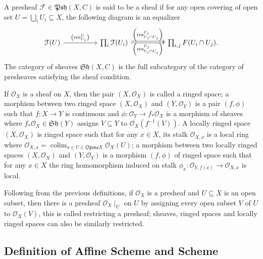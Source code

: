 \documentclass[a4paper,UKenglish,cleveref, autoref, thm-restate]{lipics-v2021}
\begin{document}
\begin{definition}
    A presheaf $\mathcal{F}\in\mathfrak{Psh}(X, C)$ is said to be a sheaf if for any open covering of open set $U=\bigcup_i U_i \subseteq X$, the following diagram is an equalizer
    $$
        \begin{tikzcd}[sep=huge]
        \mathcal{F}(U) \arrow[r, "\left(\mathrm{res}^U_{U_i}\right)"] & \prod_i \mathcal{F}(U_i) \arrow[r, "\left(\mathrm{res}^{U_i}_{U_i\cap U_j}\right)"] \arrow[r, shift left, "\left(\mathrm{res}^{U_j}_{U_i\cap U_j}\right)"'] & \prod_{i, j} F(U_i \cap U_j).
        \end{tikzcd}
    $$
    The category of sheaves $\mathfrak{Sh}(X,C)$ is the full subcategory of the category of presheaves satisfying the sheaf condition.
\end{definition}

\begin{definition} 
    If $\mathcal{O}_X$ is a sheaf on $X$, then the pair $(X, \mathcal{O}_X)$ is called a ringed space; a morphism between two ringed space $(X, \mathcal{O}_X)$ and $(Y, \mathcal{O}_Y)$ is a pair $(f, \phi)$ such that $f: X \to Y$ is continuous and $\phi : \mathcal{O}_Y\to f_*\mathcal{O}_X$ is a morphism of sheaves where $f_*\mathcal{O}_X \in\mathfrak{Sh}(Y)$ assigns $V \subseteq Y$ to $\mathcal{O}_X(f^{-1}(V))$. A locally ringed space $(X, \mathcal{O}_X)$ is ringed space such that for any $x \in X$, its stalk $\mathcal{O}_{X, x}$ is a local ring where $\mathcal{O}_{X, x}=\operatorname{colim}_{x \in U \in \mathfrak{Opens} X} \mathcal{O}_X(U)$; a morphism between two locally ringed spaces $(X, \mathcal{O}_X)$ and $(Y, \mathcal{O}_Y)$ is a morphism $(f, \phi)$ of ringed space such that for any $x\in X$ the ring homomorphism induced on stalk $\phi_x : \mathcal{O}_{Y, f(x)}\to \mathcal{O}_{X, x}$ is local.
\end{definition}

Following from the previous definitions, if $\mathcal{O}_X$ is a presheaf and $U\subseteq X$ is an open subset, then there is a presheaf $\mathcal{O}_X\!\mid_U$ on $U$ by assigning every open subset $V$ of $U$ to $\mathcal{O}_X(V)$, this is called restricting a presheaf; sheaves, ringed spaces and locally ringed spaces can also be similarly restricted.

\subsection{Definition of Affine Scheme and Scheme}\label{sec:def_scheme}
\end{document}
